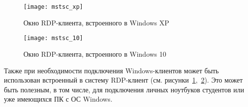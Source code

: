 \begin{figure}[p]
    \center
    \texttt{[image: mstsc\_xp]}
    \caption{Окно RDP-клиента, встроенного в Windows XP}
    \label{pic:mstsc_xp}
\end{figure}

\begin{figure}[p]
    \center
    \texttt{[image: mstsc\_10]}
    \caption{Окно RDP-клиента, встроенного в Windows 10}
    \label{pic:mstsc_10}
\end{figure}

Также при необходимости подключения Windows-клиентов может быть использован встроенный в
систему RDP-клиент (см. рисунки~\ref{pic:mstsc_xp},~\ref{pic:mstsc_10}). Это может быть
полезным, в том числе, для подключения личных ноутбуков студентов или уже имеющихся ПК
с ОС Windows.
